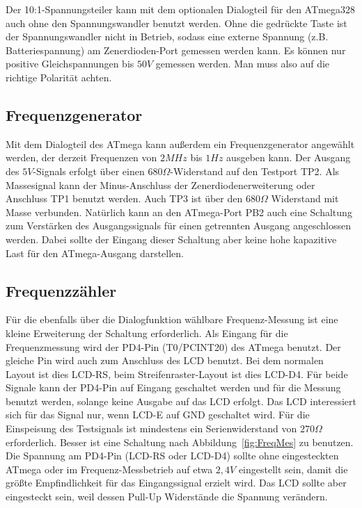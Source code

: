Der 10:1-Spannungsteiler kann mit dem optionalen Dialogteil für den ATmega328 auch ohne 
den Spannungswandler benutzt werden. Ohne die gedrückte Taste ist der Spannungswandler nicht in 
Betrieb, sodass eine externe Spannung (z.B. Batteriespannung) am Zenerdioden-Port gemessen werden kann.
Es können nur positive Gleichspannungen bis \(50V\) gemessen werden.
Man muss also auf die richtige Polarität achten.

\subsection{Frequenzgenerator}

Mit dem Dialogteil des ATmega kann außerdem ein Frequenzgenerator angewählt werden, der derzeit
Frequenzen von \(2MHz\) bis \(1Hz\) ausgeben kann. Der Ausgang des \(5V\)-Signals erfolgt über
einen \(680\Omega\)-Widerstand auf den Testport TP2. Als Massesignal kann der Minus-Anschluss
der Zenerdiodenerweiterung oder Anschluss TP1 benutzt werden.
Auch TP3 ist über den \(680\Omega\) Widerstand mit Masse verbunden.
Natürlich kann an den ATmega-Port PB2 auch eine Schaltung zum Verstärken des Ausgangssignals 
für einen getrennten Ausgang angeschlossen werden. Dabei sollte der Eingang dieser Schaltung
aber keine hohe kapazitive Last für den ATmega-Ausgang darstellen.

\subsection{Frequenzzähler}
\label{sec:frequency_counter}

Für die ebenfalls über die Dialogfunktion wählbare Frequenz-Messung ist eine kleine Erweiterung
der Schaltung erforderlich. Als Eingang für die Frequenzmessung wird der PD4-Pin (T0/PCINT20) des
ATmega benutzt. Der gleiche Pin wird auch zum Anschluss des LCD benutzt. Bei dem normalen Layout
ist dies LCD-RS, beim Streifenraster-Layout ist dies LCD-D4. Für beide Signale kann der PD4-Pin
auf Eingang geschaltet werden und für die Messung benutzt werden, solange keine Ausgabe auf das
LCD erfolgt. Das LCD interessiert sich für das Signal nur, wenn LCD-E auf GND geschaltet wird.
Für die Einspeisung des Testsignals ist mindestens ein Serienwiderstand von \(270\Omega\) erforderlich.
Besser ist eine Schaltung nach Abbildung~\ref{fig:FreqMes} zu benutzen. Die Spannung am PD4-Pin (LCD-RS oder
LCD-D4) sollte ohne eingesteckten ATmega oder im Frequenz-Messbetrieb auf etwa \(2,4V\) eingestellt sein,
damit die größte Empfindlichkeit für das Eingangssignal erzielt wird. Das LCD sollte aber eingesteckt sein,
weil dessen Pull-Up Widerstände die Spannung verändern.

